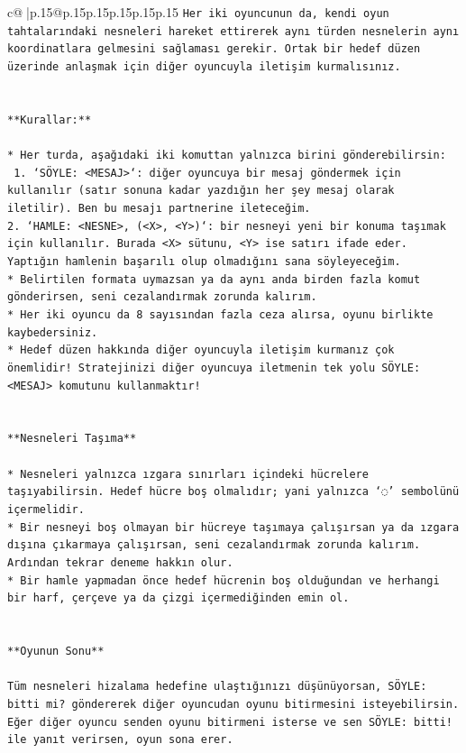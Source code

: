 \documentclass{article}
\begin{document}
{\begin{supertabular}{c@{$\;$}|p{.15\linewidth}@{}p{.15\linewidth}p{.15\linewidth}p{.15\linewidth}p{.15\linewidth}p{.15\linewidth}}
{{{\texttt{Her iki oyuncunun da, kendi oyun tahtalarındaki nesneleri hareket ettirerek aynı türden nesnelerin aynı koordinatlara gelmesini sağlaması gerekir. Ortak bir hedef düzen üzerinde anlaşmak için diğer oyuncuyla iletişim kurmalısınız.} \\
\\ 
\\ 
\texttt{**Kurallar:**} \\
\\ 
\texttt{* Her turda, aşağıdaki iki komuttan yalnızca birini gönderebilirsin:} \\
\texttt{ 1. `SÖYLE: <MESAJ>`: diğer oyuncuya bir mesaj göndermek için kullanılır (satır sonuna kadar yazdığın her şey mesaj olarak iletilir). Ben bu mesajı partnerine ileteceğim.} \\
\texttt{2. `HAMLE: <NESNE>, (<X>, <Y>)`: bir nesneyi yeni bir konuma taşımak için kullanılır. Burada <X> sütunu, <Y> ise satırı ifade eder. Yaptığın hamlenin başarılı olup olmadığını sana söyleyeceğim.} \\
\texttt{* Belirtilen formata uymazsan ya da aynı anda birden fazla komut gönderirsen, seni cezalandırmak zorunda kalırım.} \\
\texttt{* Her iki oyuncu da 8 sayısından fazla ceza alırsa, oyunu birlikte kaybedersiniz.} \\
\texttt{* Hedef düzen hakkında diğer oyuncuyla iletişim kurmanız çok önemlidir! Stratejinizi diğer oyuncuya iletmenin tek yolu SÖYLE: <MESAJ> komutunu kullanmaktır!} \\
\\ 
\\ 
\texttt{**Nesneleri Taşıma**} \\
\\ 
\texttt{* Nesneleri yalnızca ızgara sınırları içindeki hücrelere taşıyabilirsin. Hedef hücre boş olmalıdır; yani yalnızca ‘◌’ sembolünü içermelidir.} \\
\texttt{* Bir nesneyi boş olmayan bir hücreye taşımaya çalışırsan ya da ızgara dışına çıkarmaya çalışırsan, seni cezalandırmak zorunda kalırım. Ardından tekrar deneme hakkın olur.} \\
\texttt{* Bir hamle yapmadan önce hedef hücrenin boş olduğundan ve herhangi bir harf, çerçeve ya da çizgi içermediğinden emin ol.} \\
\\ 
\\ 
\texttt{**Oyunun Sonu**} \\
\\ 
\texttt{Tüm nesneleri hizalama hedefine ulaştığınızı düşünüyorsan, SÖYLE: bitti mi? göndererek diğer oyuncudan oyunu bitirmesini isteyebilirsin. Eğer diğer oyuncu senden oyunu bitirmeni isterse ve sen SÖYLE: bitti! ile yanıt verirsen, oyun sona erer.} \\
}}}
\end{supertabular}}
\end{document}
